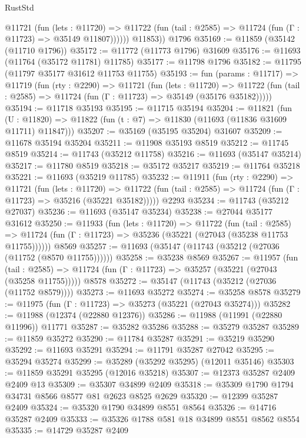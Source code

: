 \begin{lexlean}{RustStd}
\begin{coremodule}
            @11721
              (fun (lets : @11720) =>
              @11722 (fun (tail : @2585) => @11724 (fun (Γ : @11723) => @35149 @11807))))))
        @11853))
    @1796
@35169 := @11859 (@35142 (@11710 @1796))
@35172 := @11772 (@11773 @1796) @31609
@35176 := @11693 (@11764 (@35172 @11781) @11785)
@35177 := @11798 @1796
@35182 := @11795 (@11797 @35177 @31612 @11753 @11755)
@35193 := fun (params : @11717) =>
  @11719
    (fun (rty : @2290) =>
    @11721
      (fun (lets : @11720) =>
      @11722 (fun (tail : @2585) => @11724 (fun (Γ : @11723) => @35149 (@35176 @35182)))))
@35194 := @11718 @35193
@35195 := @11715 @35194
@35204 := @11821
    (fun (U : @11820) => @11822 (fun (t : @7) => @11830 (@11693 (@11836 @31609 @11711) @11847)))
@35207 := @35169 (@35195 @35204) @31607
@35209 := @11678 @35194 @35204
@35211 := @11908 @35193 @8519
@35212 := @11745 @8519
@35214 := @11743 (@35212 @11758)
@35216 := @11693 (@35147 @35214)
@35217 := @11780 @8519
@35218 := @35172 @35217
@35219 := @11764 @35218
@35221 := @11693 (@35219 @11785)
@35232 := @11911
    (fun (rty : @2290) =>
    @11721
      (fun (lets : @11720) =>
      @11722 (fun (tail : @2585) => @11724 (fun (Γ : @11723) => @35216 (@35221 @35182)))))
    @2293
@35234 := @11743 (@35212 @27037)
@35236 := @11693 (@35147 @35234)
@35238 := @27044 @35177 @31612
@35250 := @11933
    (fun (lets : @11720) =>
    @11722
      (fun (tail : @2585) =>
      @11724 (fun (Γ : @11723) => @35236 (@35221 (@27043 (@35238 @11753 @11755))))))
    @8569
@35257 := @11693 (@35147 (@11743 (@35212 (@27036 (@11752 (@8570 @11755))))))
@35258 := @35238 @8569
@35267 := @11957
    (fun (tail : @2585) => @11724 (fun (Γ : @11723) => @35257 (@35221 (@27043 (@35258 @11755)))))
    @8578
@35272 := @35147 (@11743 (@35212 (@27036 (@11752 @8579))))
@35273 := @11693 @35272
@35274 := @35258 @8578
@35279 := @11975 (fun (Γ : @11723) => @35273 (@35221 (@27043 @35274)))
@35282 := @11988 (@12374 (@22880 @12376))
@35286 := @11988 (@11991 (@22880 @11996)) @11771
@35287 := @35282 @35286
@35288 := @35279 @35287
@35289 := @11859 @35272
@35290 := @11784 @35287
@35291 := @35219 @35290
@35292 := @11693 @35291
@35294 := @11791 @35287 @27042
@35295 := @35294 @35274
@35299 := @35289 (@35292 @35295) (@12011 @35146)
@35303 := @11859 @35291 @35295 (@12016 @35218)
@35307 := @12373 @35287 @2409 @2409 @13
@35309 := @35307 @34899 @2409
@35318 := @35309 @1790 @1794 @34731 @8566 @8577 @81 @2623 @8525 @2629
@35320 := @12399 @35287 @2409
@35324 := @35320 @1790 @34899 @8551 @8564
@35326 := @14716 @35287 @2409
@35333 := @35326 @1788 @581 @18 @34899 @8551 @8562 @8554
@35335 := @14729 @35287 @2409

\end{coremodule}
\end{lexlean}
